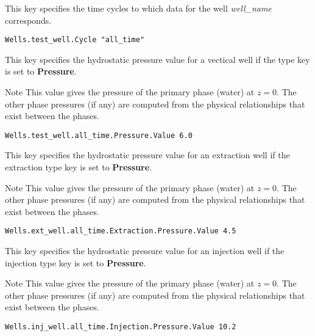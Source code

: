 {
This key specifies the time cycles to which data for the well
{\em well\_name} corresponds.
}
\begin{display}\begin{verbatim}
Wells.test_well.Cycle "all_time"
\end{verbatim}\end{display}

{
This key specifies the hydrostatic pressure value for a vectical well
if the type key is set to {\bf Pressure}.

Note This value gives the pressure of the primary phase (water) at
$z=0$.  The other phase pressures (if any) are computed from the physical
relationships that exist between the phases.
}
\begin{display}\begin{verbatim}
Wells.test_well.all_time.Pressure.Value 6.0
\end{verbatim}\end{display}

{
This key specifies the hydrostatic pressure value for an extraction well
if the extraction type key is set to {\bf Pressure}.

Note This value gives the pressure of the primary phase (water) at
$z=0$.  The other phase pressures (if any) are computed from the physical
relationships that exist between the phases.
}
\begin{display}\begin{verbatim}
Wells.ext_well.all_time.Extraction.Pressure.Value 4.5
\end{verbatim}\end{display}

{
This key specifies the hydrostatic pressure value for an injection well
if the injection type key is set to {\bf Pressure}.

Note This value gives the pressure of the primary phase (water) at
$z=0$.  The other phase pressures (if any) are computed from the physical
relationships that exist between the phases.
}
\begin{display}\begin{verbatim}
Wells.inj_well.all_time.Injection.Pressure.Value 10.2
\end{verbatim}\end{display}

